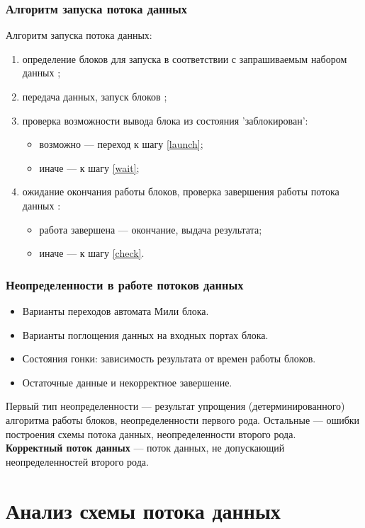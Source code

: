 \documentclass[10pt,pdf,hyperref={unicode}]{beamer}
\begin{document}
\begin{frame}
  \frametitle{Алгоритм запуска потока данных}
  Алгоритм запуска потока данных:
  \begin{enumerate}
    \item определение блоков для запуска в соответствии с запрашиваемым набором данных \label{check};
    \item передача данных, запуск блоков \label{launch};
    \item проверка возможности вывода блока из состояния 'заблокирован':
      \begin{itemize}
        \item возможно --- переход к шагу \ref{launch};
        \item иначе --- к шагу \ref{wait};
      \end{itemize}
    \item ожидание окончания работы блоков, проверка завершения работы потока данных \label{wait}:
    \begin{itemize}
      \item работа завершена --- окончание, выдача результата;
      \item иначе --- к шагу \ref{check}.
    \end{itemize}
  \end{enumerate}
\end{frame}

\begin{frame}
  \frametitle{Неопределенности в работе потоков данных}
  \begin{itemize}
    \item Варианты переходов автомата Мили блока.
    \item Варианты поглощения данных на входных портах блока.
    \item Состояния гонки: зависимость результата от времен работы блоков.
    \item Остаточные данные и некорректное завершение.
  \end{itemize}
  Первый тип неопределенности --- результат упрощения (детерминированного) алгоритма работы блоков, неопределенности первого рода.
  Остальные --- ошибки построения схемы потока данных, неопределенности второго рода.\\
  \textbf{Корректный поток данных} --- поток данных, не допускающий неопределенностей второго рода.
\end{frame}

\section{Анализ схемы потока данных}
\end{document}
